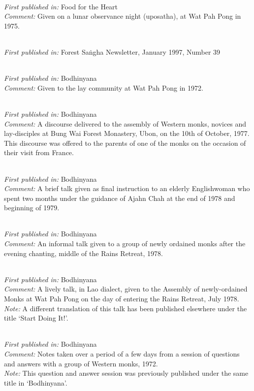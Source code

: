 { \\
\textit{First published in:} Food for the Heart \\
\textit{Comment:} Given on a lunar observance night (uposatha), at Wat Pah Pong in 1975.

 \\
\textit{First published in:} Forest Sa\.ngha Newsletter, January 1997, Number 39

 \\
\textit{First published in:} Bodhinyana \\
\textit{Comment:} Given to the lay community at Wat Pah Pong in 1972.

 \\
\textit{First published in:} Bodhinyana \\
\textit{Comment:} A discourse delivered to the assembly of Western monks, novices and lay-disciples at Bung Wai Forest Monastery, Ubon, on the 10th of October, 1977. This discourse was offered to the parents of one of the monks on the occasion of their visit from France.

\clearpage

 \\
\textit{First published in:} Bodhinyana \\
\textit{Comment:} A brief talk given as final instruction to an elderly Englishwoman who spent two months under the guidance of Ajahn Chah at the end of 1978 and beginning of 1979.

 \\
\textit{First published in:} Bodhinyana \\
\textit{Comment:} An informal talk given to a group of newly ordained monks after the evening chanting, middle of the Rains Retreat, 1978.

 \\
\textit{First published in:} Bodhinyana \\
\textit{Comment:} A lively talk, in Lao dialect, given to the Assembly of newly-ordained Monks at Wat Pah Pong on the day of entering the Rains Retreat, July 1978. \\
\textit{Note:} A different translation of this talk has been published elsewhere under the title `Start Doing It!'.

 \\
\textit{First published in:} Bodhinyana \\
\textit{Comment:} Notes taken over a period of a few days from a session of questions and answers with a group of Western monks, 1972. \\
\textit{Note:} This question and answer session was previously published under the same title in `Bodhinyana'.

}
